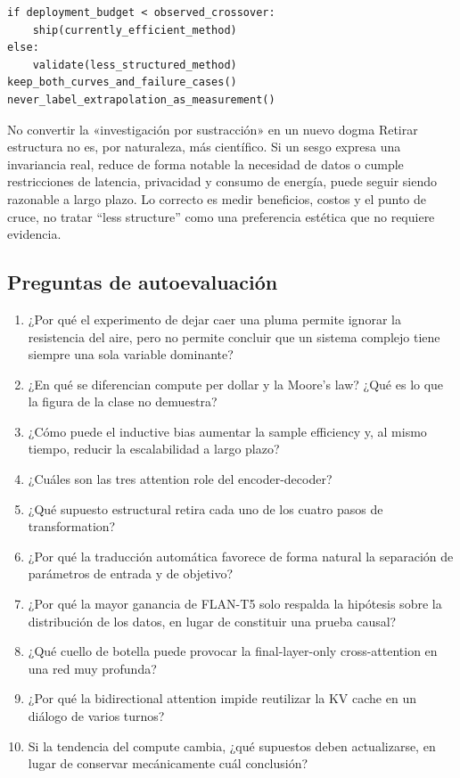 \begin{lstlisting}[caption={Pseudocódigo de decisión para distinguir el óptimo actual de la tendencia de largo plazo}]
if deployment_budget < observed_crossover:
    ship(currently_efficient_method)
else:
    validate(less_structured_method)
keep_both_curves_and_failure_cases()
never_label_extrapolation_as_measurement()
\end{lstlisting}

\begin{warningbox}{No convertir la «investigación por sustracción» en un nuevo dogma}
Retirar estructura no es, por naturaleza, más científico. Si un sesgo expresa una invariancia real, reduce de forma notable la necesidad de datos o cumple restricciones de latencia, privacidad y consumo de energía, puede seguir siendo razonable a largo plazo. Lo correcto es medir beneficios, costos y el punto de cruce, no tratar ``less structure'' como una preferencia estética que no requiere evidencia.
\end{warningbox}

\subsection{Preguntas de autoevaluación}

\begin{enumerate}
  \item ¿Por qué el experimento de dejar caer una pluma permite ignorar la resistencia del aire, pero no permite concluir que un sistema complejo tiene siempre una sola variable dominante?
  \item ¿En qué se diferencian compute per dollar y la Moore's law? ¿Qué es lo que la figura de la clase no demuestra?
  \item ¿Cómo puede el inductive bias aumentar la sample efficiency y, al mismo tiempo, reducir la escalabilidad a largo plazo?
  \item ¿Cuáles son las tres attention role del encoder-decoder?
  \item ¿Qué supuesto estructural retira cada uno de los cuatro pasos de transformation?
  \item ¿Por qué la traducción automática favorece de forma natural la separación de parámetros de entrada y de objetivo?
  \item ¿Por qué la mayor ganancia de FLAN-T5 solo respalda la hipótesis sobre la distribución de los datos, en lugar de constituir una prueba causal?
  \item ¿Qué cuello de botella puede provocar la final-layer-only cross-attention en una red muy profunda?
  \item ¿Por qué la bidirectional attention impide reutilizar la KV cache en un diálogo de varios turnos?
  \item Si la tendencia del compute cambia, ¿qué supuestos deben actualizarse, en lugar de conservar mecánicamente cuál conclusión?
\end{enumerate}

